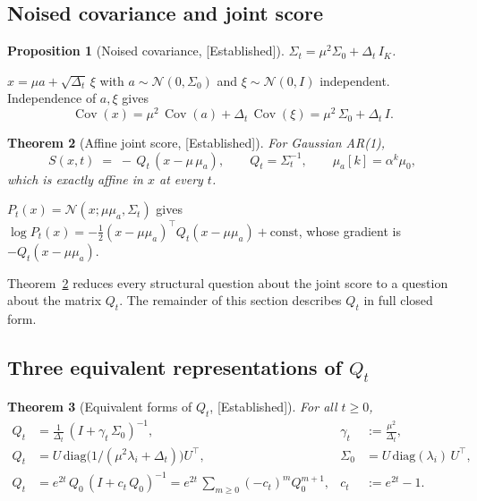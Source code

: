 \documentclass[11pt]{article}
\newtheorem{proposition}{Proposition}
\newtheorem{theorem}[proposition]{Theorem}
\theoremstyle{definition}
\newcommand{\Cov}{\operatorname{Cov}}
\newcommand{\Sig}{\Sigma}
\newcommand{\Detl}{\Delta_t}
\newcommand{\Established}{\textcolor{black!50!green}{\textsf{[Established]}}}
\begin{document}
\subsection{Noised covariance and joint score}

\begin{proposition}[Noised covariance, \Established]
\(\Sig_t = \mu^2 \Sig_0 + \Detl\, I_K\).
\end{proposition}

\begin{derivation}
\(x = \mu a + \sqrt{\Detl}\, \xi\) with \(a \sim \mathcal N(0, \Sig_0)\)
and \(\xi \sim \mathcal N(0, I)\) independent. Independence of
\(a, \xi\) gives
\begin{equation}
    \Cov(x) = \mu^2\, \Cov(a) + \Detl\, \Cov(\xi) = \mu^2\, \Sig_0 + \Detl\, I.
\end{equation}
\end{derivation}

\begin{theorem}[Affine joint score, \Established]\label{thm:affine-score}
For Gaussian AR(1),
\begin{equation}
    S(x, t) \;=\; -\, Q_t\, (x - \mu\, \mu_a),
    \qquad Q_t = \Sig_t^{-1}, \qquad \mu_a[k] = \alpha^k \mu_0,
\end{equation}
which is exactly affine in \(x\) at every \(t\).
\end{theorem}

\begin{derivation}
\(P_t(x) = \mathcal N(x; \mu \mu_a, \Sig_t)\) gives
\(\log P_t(x) = -\tfrac{1}{2} (x - \mu \mu_a)^\top Q_t (x - \mu \mu_a) +
\text{const}\), whose gradient is \(-Q_t (x - \mu \mu_a)\).
\end{derivation}

Theorem~\ref{thm:affine-score} reduces every structural question about
the joint score to a question about the matrix \(Q_t\). The remainder
of this section describes \(Q_t\) in full closed form.

\subsection{Three equivalent representations of \(Q_t\)}

\begin{theorem}[Equivalent forms of \(Q_t\), \Established]\label{thm:three-forms}
For all \(t \geq 0\),
\begin{align}
    Q_t &= \tfrac{1}{\Detl}\, (I + \gamma_t\, \Sig_0)^{-1}, &
    \gamma_t &:= \tfrac{\mu^2}{\Detl}, \tag{SNR form} \label{eq:Qt-snr}\\
    Q_t &= U\, \mathrm{diag}\!\bigl( 1 / (\mu^2 \lambda_i + \Detl)\bigr) U^\top, &
    \Sig_0 &= U\, \mathrm{diag}(\lambda_i)\, U^\top, \tag{spectral form} \label{eq:Qt-spec}\\
    Q_t &= e^{2 t}\, Q_0\, (I + c_t\, Q_0)^{-1}
         = e^{2 t}\, \sum_{m \geq 0} (- c_t)^m Q_0^{m+1}, &
    c_t &:= e^{2 t} - 1. \tag{resolvent form} \label{eq:Qt-resolvent}
\end{align}
\end{theorem}
\end{document}
